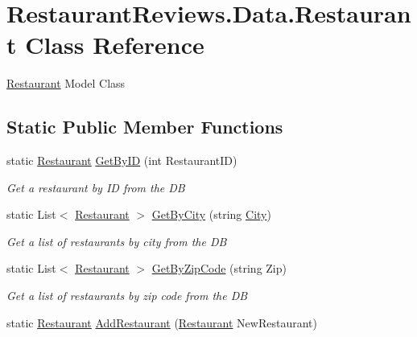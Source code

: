 \hypertarget{class_restaurant_reviews_1_1_data_1_1_restaurant}{}\section{Restaurant\+Reviews.\+Data.\+Restaurant Class Reference}
\label{class_restaurant_reviews_1_1_data_1_1_restaurant}


\hyperlink{class_restaurant_reviews_1_1_data_1_1_restaurant}{Restaurant} Model Class  


\subsection*{Static Public Member Functions}
\begin{DoxyCompactItemize}
\item 
static \hyperlink{class_restaurant_reviews_1_1_data_1_1_restaurant}{Restaurant} \hyperlink{class_restaurant_reviews_1_1_data_1_1_restaurant_a2304f56c7e96a23cf7fd63b520ea4f52}{Get\+By\+ID} (int Restaurant\+ID)
\begin{DoxyCompactList}\small\item\em Get a restaurant by ID from the DB \end{DoxyCompactList}\item 
static List$<$ \hyperlink{class_restaurant_reviews_1_1_data_1_1_restaurant}{Restaurant} $>$ \hyperlink{class_restaurant_reviews_1_1_data_1_1_restaurant_add3de8f9ef09418b5620f22c7212d0bc}{Get\+By\+City} (string \hyperlink{class_restaurant_reviews_1_1_data_1_1_restaurant_a9186d3064bc2da5e4916b34dbf2c55af}{City})
\begin{DoxyCompactList}\small\item\em Get a list of restaurants by city from the DB \end{DoxyCompactList}\item 
static List$<$ \hyperlink{class_restaurant_reviews_1_1_data_1_1_restaurant}{Restaurant} $>$ \hyperlink{class_restaurant_reviews_1_1_data_1_1_restaurant_a325a60b778fabafcdf5a76a0bf3f2aba}{Get\+By\+Zip\+Code} (string Zip)
\begin{DoxyCompactList}\small\item\em Get a list of restaurants by zip code from the DB \end{DoxyCompactList}\item 
static \hyperlink{class_restaurant_reviews_1_1_data_1_1_restaurant}{Restaurant} \hyperlink{class_restaurant_reviews_1_1_data_1_1_restaurant_a37290bac3fcfb9c212ea36f0fd03b85c}{Add\+Restaurant} (\hyperlink{class_restaurant_reviews_1_1_data_1_1_restaurant}{Restaurant} New\+Restaurant)

\end{DoxyCompactItemize}
